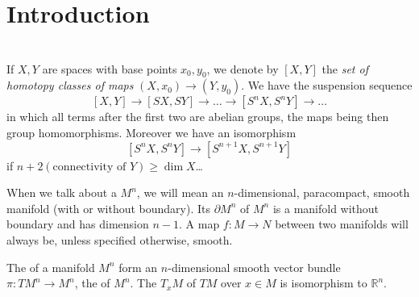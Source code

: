 \documentclass[a4paper]{article}
\begin{document}
\maketitle
{}
\tableofcontents
{}

\setcounter{section}{-1}

\section{Introduction}

\section{}


\begin{definition}[]
    If $X,Y$ are spaces with base points $x_0,y_0$, we denote by $[X,Y]$ the \emph{set of homotopy classes of maps} $(X,x_0)\to(Y,y_0)$. We have the suspension sequence 
    \[[X,Y]\to[SX,SY]\to\dots\to[S^n X,S^n Y]\to\dots\]
    in which all terms after the first two are abelian groups, the maps being then group homomorphisms.
    Moreover we have an isomorphism 
    \[[S^n X, S^n Y]\to[S^{n+1} X, S^{n+1} Y]\]
    if $n+2(\text{connectivity of }Y)\geq\dim X$\dots
\end{definition}\cite[p.1]{atiyah}

\begin{definition}[Manifold]
  When we talk about a  $M^n$, we will mean an $n$-dimensional, paracompact, smooth manifold (with or without boundary).
  Its  $\partial M^n$ of $M^n$ is a manifold without boundary and has dimension $n-1$.
  A map $f:M\to N$ between two manifolds will always be, unless specified otherwise, smooth.
\end{definition}\cite[p.1]{brocker}

\begin{definition}
  The  of a manifold $M^n$ form an $n$-dimensional smooth vector bundle $\pi:TM^n\to M^n$, the  of $M^n$.
  The  $T_x M$ of $TM$ over $x\in M$ is isomorphism to $\mathbb{R}^n$.
\end{definition}\cite[p.1]{brocker}
\end{document}
